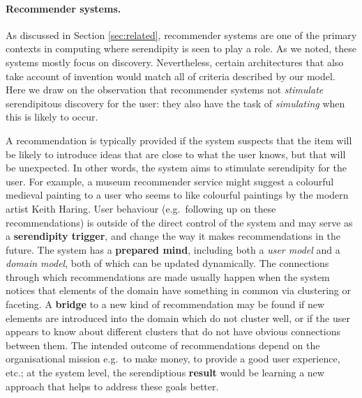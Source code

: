 
\paragraph{Recommender systems.} 

As discussed in Section \ref{sec:related}, recommender systems are one
of the primary contexts in computing where serendipity is seen to play
a role.  As we noted, these systems mostly focus on discovery.
Nevertheless, certain architectures that also take account of
invention would match all of criteria described by our model.  Here we
draw on the observation that recommender systems not \emph{stimulate}
serendipitous discovery for the user: they also have the task of
\emph{simulating} when this is likely to occur.

A recommendation is typically provided if the system suspects that the
item will be likely to introduce ideas that are close to what the user
knows, but that will be unexpected.  In other words, the system aims
to stimulate serendipity for the user. For example, a museum
recommender service might suggest a colourful medieval painting to a
user who seems to like colourful paintings by the modern artist Keith
Haring.  User behaviour (e.g.~following up on these recommendations)
is outside of the direct control of the system and may serve as a
\textbf{serendipity trigger}, and change the way it makes
recommendations in the future.  The system has a \textbf{prepared
  mind}, including both a \emph{user model} and a \emph{domain model},
both of which can be updated dynamically.  The connections through
which recommendations are made usually happen when the system notices
that elements of the domain have something in common via clustering or
faceting.  A \textbf{bridge} to a new kind of recommendation may be
found if new elements are introduced into the domain which do not
cluster well, or if the user appears to know about different clusters
that do not have obvious connections between them.  The intended
outcome of recommendations depend on the organisational mission
e.g.~to make money, to provide a good user experience, etc.; at the
system level, the serendiptious \textbf{result} would be learning a
new approach that helps to address these goals better.

